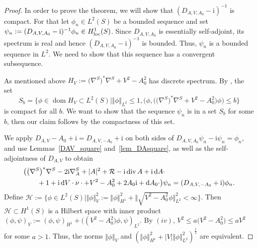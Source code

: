 \documentclass[pdftex]{sigma}
\numberwithin{equation}{section}
\begin{document}
\begin{proof} In order to prove the theorem, we will show that $(D_{A,V, A_0}-\mathrm{i})^{-1}$ is compact. For that let $\phi_n\in L^2(S)$ be a bounded sequence and set $\psi_n:= (D_{A,V, A_0}-\mathrm{i})^{-1}\phi_n \in H^1_{\rm loc}(S)$.
Since $D_{A,V, A_0}$ is essentially self-adjoint, its spectrum is real and hence $(D_{A,V, A_0}-\mathrm{i})^{-1}$ is bounded. Thus, $\psi_n$ is a bounded sequence in $L^2$. We need to show that this sequence has a convergent subsequence.
	
As mentioned above ${H}_V:= \bigl(\nabla^S\bigr)^*\nabla^S + V^2-A_0^2$ has discrete spectrum. By \cite[Theorem~XIII.64]{RS4}, the set
\[S_b=\bigl\{\phi\in \operatorname{dom}  {H}_V  \subset  L^2(S)\mid \Vert \phi\Vert_{L^2}\leq 1, \bigl(\phi, \bigl(\bigl(\nabla^S\bigr)^*\nabla^S + {V}^2-A_0^2\bigr)\phi\bigr)\leq b \bigr\}\]
is compact for all $b$. We want to show that the sequence $\psi_n$ is in a set $S_b$ for some $b$, then our claim follows by the compactness of this set.
		
We apply $D_{A,V} -A_0 + \mathrm{i}= D_{A,V,-A_0} + \mathrm{i}$ on both sides of $D_{A,V,A_0} \psi_n - {\mathrm{i}}  \psi_n =\phi_n$, and use Lemmas~\ref{DAV_square} and~\ref{lem_DAsquare}, as well as the self-adjointness of $D_{A,V}$ to obtain
\begin{align*}
& \bigl( \bigl(\nabla^S\bigr)^* \nabla^S -2{\mathrm{i}}  \nabla^S_A + |A|^2 + \mathcal{R} -\mathrm{i}  \operatorname{div} A +{\mathrm{i}}\, {\rm d}A\cdot \\
& \qquad {}+ 1+ {\mathrm{i}} \, {\rm d}V\cdot \nu\cdot +V^2 - A_0^2 +2A_0\mathrm{i}+ {\rm d}A_0\cdot \bigr)\psi_n= (D_{A,V, -A_0} +\mathrm{i})\phi_n.\end{align*}
Define
$\mathcal{H} := \bigl\{ \phi \in L^2(S)\mid \Vert \phi\Vert_{{V}}^2:= \Vert \phi\Vert_{H^1}^2 + \bigl\Vert \sqrt{{V^2}-A_0^2}\phi\bigr\Vert_{L^2}^2<\infty \bigr\}$. Then $\mathcal{H}\subset H^1(S)$ is a Hilbert space with inner product $(\phi, \psi)_{{V}}:= (\phi, \psi)_{H^1}+\bigl(({V}^2-A_0^2\bigr)\phi, \psi)_{L^2}$. By $(iv)$, $V^2\leq a\bigl(V^2-A_0^2\bigr)\leq a V^2$ for some $a>1$. Thus, the norms $\Vert \phi\Vert_{{V}}$ and $(\Vert \phi\Vert_{H^1}^2 + |V| \Vert\phi\Vert_{L^2}^2)^\frac{1}{2}$ are equivalent.
	

\end{proof}
\end{document}
